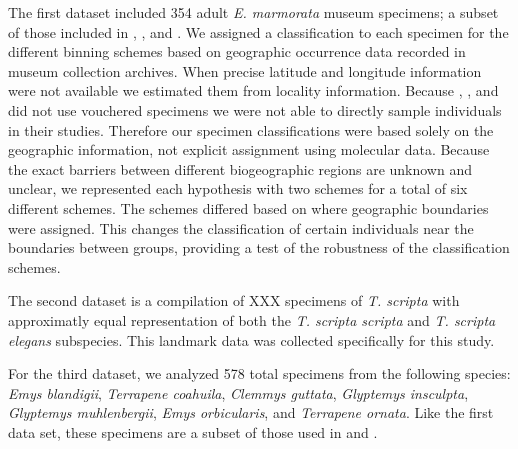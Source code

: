 \documentclass[12pt,letterpaper]{article}
\begin{document}
The first dataset included 354 adult \textit{E. marmorata} museum specimens; a subset of those included in \citet{Angielczyk2007}, \citet{Angielczyk2011}, and \citet{Angielczyk2013a}. We assigned a classification to each specimen for the different binning schemes based on geographic occurrence data recorded in museum collection archives. When precise latitude and longitude information were not available we estimated them from locality information. Because \citet{Spinks2005}, \citet{Spinks2010}, and \citet{Spinks2014} did not use vouchered specimens we were not able to directly sample individuals in their studies. Therefore our specimen classifications were based solely on the geographic information, not explicit assignment using molecular data. Because the exact barriers between different biogeographic regions are unknown and unclear, we represented each hypothesis with two schemes for a total of six different schemes. The schemes differed based on where geographic boundaries were assigned. This changes the classification of certain individuals near the boundaries between groups, providing a test of the robustness of the classification schemes.

The second dataset is a compilation of XXX specimens of \textit{T. scripta} with approximatly equal representation of both the \textit{T. scripta scripta} and \textit{T. scripta elegans} subspecies. This landmark data was collected specifically for this study.

For the third dataset, we analyzed 578 total specimens from the following species: \textit{Emys blandigii}, \textit{Terrapene coahuila}, \textit{Clemmys guttata}, \textit{Glyptemys insculpta}, \textit{Glyptemys muhlenbergii}, \textit{Emys orbicularis}, and \textit{Terrapene ornata}. Like the first data set, these specimens are a subset of those used in \citet{Angielczyk2011} and \citet{Angielczyk2013a}.
\end{document}
